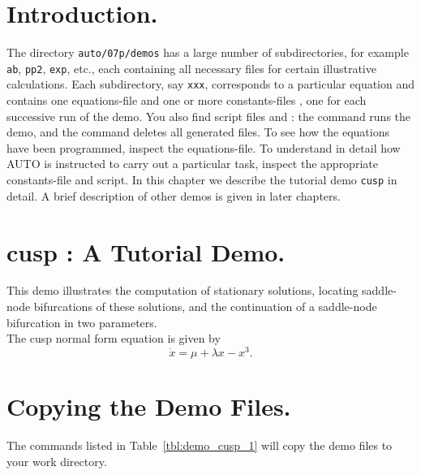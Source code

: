 \documentclass[12pt]{report}
\begin{document}
\section{ Introduction.} \label{sec:Tutorial_Introduction}
The directory {\tt auto/07p/demos} has a large number of subdirectories,
for example {\tt ab}, {\tt pp2}, {\tt exp}, etc.,
each containing all necessary files for certain illustrative calculations.
Each subdirectory, say {\tt xxx}, corresponds to a particular equation
and contains one equations-file 
and one or more constants-files , 
one for each successive run of the demo.
You also find \python script files  and
: the command  runs the demo,
and the command  deletes all generated files.
To see how the equations have been programmed, inspect the equations-file. 
To understand in detail how {\cal AUTO} is instructed to carry out a 
particular task, inspect the appropriate constants-file and \python
script.
In this chapter we describe the tutorial demo {\tt cusp} in detail.
A brief description of other demos is given in later chapters.


\section{ cusp : A Tutorial Demo.} \label{sec:Demos_cusp}
This demo illustrates the computation of 
stationary solutions, locating saddle-node bifurcations of these
solutions, and the continuation of a saddle-node bifurcation in two
parameters.\\
The cusp normal form equation is given by
\begin{equation}
  \dot x = \mu + \lambda x - x^3.
\end{equation}

\section{ Copying the Demo Files.}  \label{sec:Tutorial_copying}
The commands listed in Table~\ref{tbl:demo_cusp_1}
will copy the demo files to your work directory.
\end{document}
